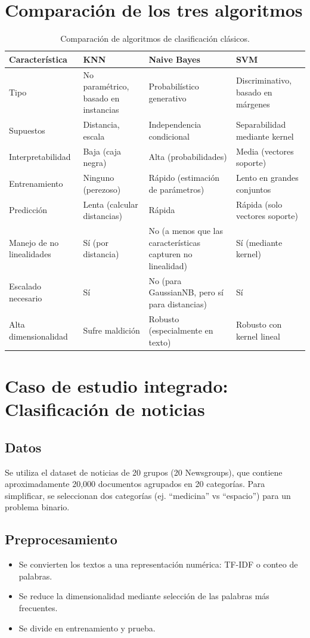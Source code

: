 \documentclass[12pt,a4paper,openany,oneside]{book}
\begin{document}
\section{Comparación de los tres algoritmos}

\begin{table}[h]
\centering
\begin{tabular}{|l|l|l|l|}
\hline
\textbf{Característica} & \textbf{KNN} & \textbf{Naive Bayes} & \textbf{SVM} \\
\hline
Tipo & No paramétrico, basado en instancias & Probabilístico generativo & Discriminativo, basado en márgenes \\
Supuestos & Distancia, escala & Independencia condicional & Separabilidad mediante kernel \\
Interpretabilidad & Baja (caja negra) & Alta (probabilidades) & Media (vectores soporte) \\
Entrenamiento & Ninguno (perezoso) & Rápido (estimación de parámetros) & Lento en grandes conjuntos \\
Predicción & Lenta (calcular distancias) & Rápida & Rápida (solo vectores soporte) \\
Manejo de no linealidades & Sí (por distancia) & No (a menos que las características capturen no linealidad) & Sí (mediante kernel) \\
Escalado necesario & Sí & No (para GaussianNB, pero sí para distancias) & Sí \\
Alta dimensionalidad & Sufre maldición & Robusto (especialmente en texto) & Robusto con kernel lineal \\
\hline
\end{tabular}
\caption{Comparación de algoritmos de clasificación clásicos.}
\end{table}

\section{Caso de estudio integrado: Clasificación de noticias}

\subsection{Datos}
Se utiliza el dataset de noticias de 20 grupos (20 Newsgroups), que contiene aproximadamente 20,000 documentos agrupados en 20 categorías. Para simplificar, se seleccionan dos categorías (ej. ``medicina'' vs ``espacio'') para un problema binario.

\subsection{Preprocesamiento}
\begin{itemize}
    \item Se convierten los textos a una representación numérica: TF-IDF o conteo de palabras.
    \item Se reduce la dimensionalidad mediante selección de las palabras más frecuentes.
    \item Se divide en entrenamiento y prueba.
\end{itemize}
\end{document}
